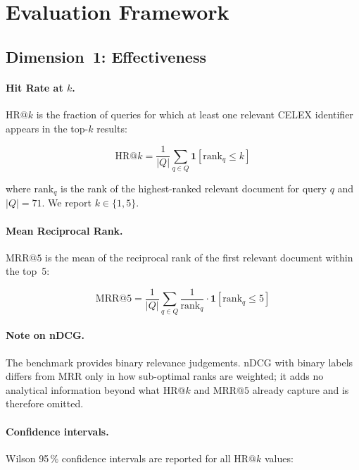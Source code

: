 \documentclass[sigconf,screen]{acmart}
\makeatletter
\newcommand{\HR}[1]{\mathrm{HR}@{#1}}
\newcommand{\MRR}[1]{\mathrm{MRR}@{#1}}
\makeatother
\begin{document}
\section{Evaluation Framework}
\label{sec:eval}

\subsection{Dimension~1: Effectiveness}
\label{sec:eval-effectiveness}

\paragraph{Hit Rate at $k$.}
$\HR{k}$ is the fraction of queries for which at least one relevant
CELEX identifier appears in the top-$k$ results:

\begin{equation}
  \label{eq:hitrate}
  \HR{k} = \frac{1}{|Q|}\sum_{q \in Q}
    \mathbf{1}\!\left[\mathrm{rank}_q \leq k\right]
\end{equation}

\noindent where $\mathrm{rank}_q$ is the rank of the highest-ranked
relevant document for query $q$ and $|Q|{=}71$.  We report
$k \in \{1, 5\}$.

\paragraph{Mean Reciprocal Rank.}
$\MRR{5}$ is the mean of the reciprocal rank of the first relevant
document within the top~5:

\begin{equation}
  \label{eq:mrr}
  \MRR{5} = \frac{1}{|Q|}\sum_{q \in Q}
    \frac{1}{\mathrm{rank}_q}\cdot
    \mathbf{1}\!\left[\mathrm{rank}_q \leq 5\right]
\end{equation}

\paragraph{Note on nDCG.}
The benchmark provides binary relevance judgements.  nDCG with binary
labels differs from MRR only in how sub-optimal ranks are weighted;
it adds no analytical information beyond what $\HR{k}$ and $\MRR{5}$
already capture and is therefore omitted.

\paragraph{Confidence intervals.}
Wilson 95\,\% confidence intervals are reported for all $\HR{k}$
values:
\end{document}
